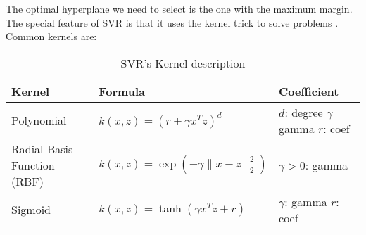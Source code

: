 \documentclass{ieeeojies}
\begin{document}
The optimal hyperplane we need to select is the one with the maximum margin. The special feature of SVR is that it uses the kernel trick to solve problems \cite{svr3}. Common kernels are: 

\begin{table}[H]
    \centering
    \begin{tabular}{|m{80pt}|m{100pt}|m{35pt}|} \hline 
         Kernel & Formula & Coefficient \\ \hline 
         Polynomial & $k(x,z) = (r + \gamma x^Tz)^d$ & $d$: degree \newline $\gamma$ gamma \newline $r$: coef \\ \hline 
         Radial Basis Function (RBF) & $k(x,z) = \exp(-\gamma\|x-z\|_2^2)$ &  $\gamma > 0$: gamma\newline \newline  \\ \hline 
         Sigmoid & $k(x,z) = \tanh(\gamma x^Tz + r)$ & $\gamma$: gamma \newline\newline $r$: coef \\ \hline
    \end{tabular}
     \caption{SVR's Kernel description}
\end{table}
\end{document}
